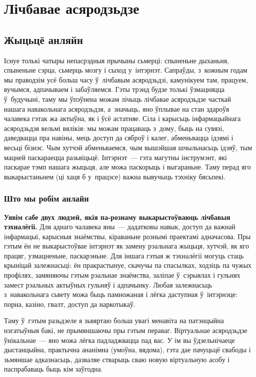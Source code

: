 \chapter{Лічбавае асяродзьдзе}

\section{Жыцьцё анляйн}

Існуе толькі чатыры непасрэдныя прычыны сьмерці: спыненьне дыханьня, спыненьне сэрца, сьмерць мозгу і сыход у~інтэрнэт. Сапраўды, з~кожным годам мы праводзім усё больш часу ў~лічбавым асяродзьдзі, камунікуем там, працуем, вучымся, адпачываем і забаўляемся. Гэты трэнд будзе толькі ўзмацняцца ў~будучыні, таму мы ўпэўнена можам лічыць лічбавае асяродзьдзе часткай нашага навакольнага асяродзьдзя, а~значыць, яно ўплывае на стан здароўя чалавека гэтак жа актыўна, як і ўсё астатняе. Сіла і карысьць інфармацыйнага асяродзьдзя вельмі вялікія: мы можам працаваць з~дому, быць на сувязі, даведвацца пра навіны, мець доступ да сяброў і калег, абменьвацца ідэямі і весьці бізнэс. Чым хутчэй абменьваемся, чым вышэйшая шчыльнасьць ідэяў, тым мацней паскараецца разьвіцьцё. Інтэрнэт~--- гэта магутны інструмэнт, які паскарае тэмп нашага жыцьця, але можа паскорыць і выгараньне. Таму перад яго выкарыстаньнем (ці хаця б у~працэсе) важна вывучыць тэхніку бясьпекі.

\subsection*{Што мы робім анлайн}

\textbf{Уявім сабе двух людзей, якія па-рознаму выкарыстоўваюць лічбавыя тэхналёгіі.} Для аднаго чалавека яны~--- дадатковы навык, доступ да важнай інфармацыі, карысныя знаёмствы, кіраваньне рознымі праектамі адначасова. Пры гэтым ён не выкарыстоўвае інтэрнэт як замену рэальнага жыцьця, хутчэй, як яго працяг, узмацненьне, паскарэньне. Для іншага гэтыя ж тэхналёгіі могуць стаць крыніцай залежнасьці: ён пракрастынуе, скачучы па спасылках, ходзіць па чужых профілях, замяняючы гэтым рэальнае знаёмства, заліпае ў~сэрыялах і гульнях замест рэальных актыўных гульняў і адпачынку. Любая залежнасьць з~навакольнага сьвету можа быць памножаная і лёгка даступная ў~інтэрнэце: порна, казіно, гвалт, доступ да наркотыкаў.

Таму ў~гэтым разьдзеле я зьвяртаю больш увагі менавіта на патэнцыйна нэгатыўныя бакі, не прымяншаючы пры гэтым пераваг. Віртуальнае асяродзьдзе ўнікальнае~--- яно можа лёгка падладжвацца пад вас. У ім вы ўдзельнічаеце дыстанцыйна, практычна ананімна (умоўна, вядома), гэта дае пачуцьцё свабоды і зьмяншае адказнасьць, дазваляе стварыць сваю новую віртуальную асобу і паспрабаваць быць кім заўгодна.

